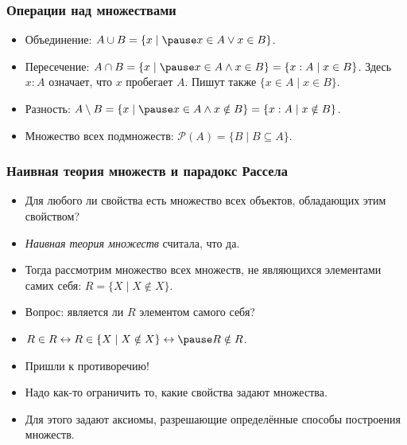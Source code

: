 \documentclass[10pt]{beamer}
\begin{document}
\begin{frame}
    \frametitle{Операции над множествами}
    \begin{itemize}
        \item Объединение: $A \cup B = \{x \mid \pause x \in A \lor x \in B\}$.
        \pause
        \item Пересечение: $A \cap B = \{x \mid \pause x \in A \land x \in B\} = \{x : A \mid x \in B\}$.
        Здесь $x:A$ означает, что $x$ пробегает $A$. Пишут также $\{x\in A\mid x\in B\}$.
        \pause
        \item Разность: $A \setminus B = \{x \mid \pause x \in A \land x \notin B\} = \{x : A \mid x \notin B\}$.
        \pause
        \item Множество всех подмножеств: $\mathcal{P}(A) = \{ B \mid B \subseteq A \}$.
    \end{itemize}
\end{frame}

\begin{frame}
    \frametitle{Наивная теория множеств и парадокс Рассела}
    \begin{itemize}
        \item Для любого ли свойства есть множество всех объектов, обладающих этим свойством?
        \item \emph{Наивная теория множеств} считала, что да.
        \item Тогда рассмотрим множество всех множеств, не являющихся элементами самих себя: $R = \{X \mid X \notin X\}$.
        \item Вопрос: является ли $R$ элементом самого себя?
        \pause
        \item $R \in R \leftrightarrow R \in \{X \mid X \notin X\} \leftrightarrow \pause R \notin R$.
        \item Пришли к противоречию!
        \pause
        \item Надо как-то ограничить то, какие свойства задают множества.
        \item Для этого задают аксиомы, разрешающие определённые способы построения множеств.
    \end{itemize}
\end{frame}
\end{document}
